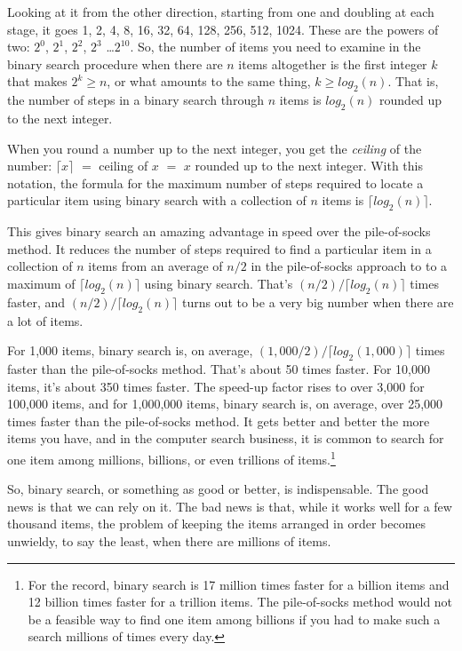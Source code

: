 Looking at it from the other direction, starting from one
and doubling at each stage, it goes 1, 2, 4, 8, 16, 32, 64,
128, 256, 512, 1024. These are the powers of two:
$2^0$, $2^1$, $2^2$, $2^3$ \dots $2^{10}$.
So, the number of items you need to examine
in the binary search procedure
when there are $n$ items altogether is the
first integer $k$ that makes $2^k \geq n$, or
what amounts to the same thing, $k \geq log_2(n)$.
That is, the number of steps in a
binary search through
$n$ items is $log_2(n)$ rounded up
to the next integer.

When you round a number up to the next integer, you get the
\emph{ceiling}
of the number:
$\lceil x \rceil$ $=$ ceiling of $x$ $=$ $x$ rounded up to the next integer.
With this notation, the formula for the maximum number of steps
required to locate a particular item using
binary search with a collection of $n$ items
is $\lceil log_2(n) \rceil$.

This gives binary search an amazing
advantage in speed over the pile-of-socks method.
It reduces the number of steps required to find a particular item
in a collection of $n$ items from an average of $n/2$
in the pile-of-socks approach to
to a maximum of $\lceil log_2(n) \rceil$
using binary search.
That's $(n/2)/\lceil log_2(n) \rceil$ times faster,
and $(n/2)/\lceil log_2(n) \rceil$ turns
out to be a very big number when there are a lot of items.

For 1,000 items,
binary search is, on average,
$(1,000/2)/\lceil log_2(1,000) \rceil$ times faster than the pile-of-socks method.
That's about 50 times faster.
For 10,000 items, it's about 350 times faster.
The speed-up factor rises to over 3,000 for 100,000 items,
and for 1,000,000 items, binary search is, on average,
over 25,000 times faster than the pile-of-socks method.
It gets better and better the more items you have,
and in the computer search business, it is common to search for one item among
millions, billions, or even trillions of items.\footnote{For the record,
binary search is 17 million times faster for a billion items
and 12 billion times faster for a trillion items.
The pile-of-socks method would not be a feasible way
to find one item among billions if you had to make such a search
millions of times every day.}

So, binary search, or something as good or better, is indispensable.
The good news is that we can rely on it.
The bad news is that, while it works
well for a few thousand items, the problem of
keeping the items arranged in order
becomes unwieldy, to say the least, when there are
millions of items.

